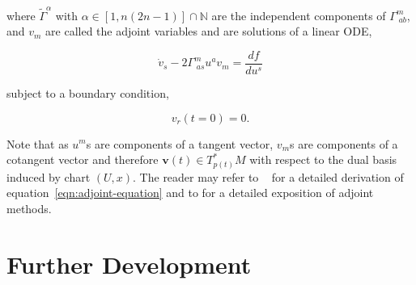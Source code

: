 \documentclass{article}
\begin{document}
where $\tilde{\Gamma}^{\alpha}$ with $\alpha \in [1,n(2n-1)] \cap
\mathbb{N}$ are the independent components of $\Gamma^{m}_{\;ab}$, and
$v_{m}$ are called the adjoint variables and are solutions of a linear
ODE,

\begin{equation}\label{eqn:adjoint-equation}
\dot{v}_{s} - 2 \Gamma^{m}_{\;as} u^{a} v_{m} = \frac{df}{du^{s}}
\end{equation}

subject to a boundary condition,

\begin{equation}\label{eqn:adjoint-bc}
v_{r}( t = 0 ) = 0.
\end{equation}

Note that as $u^{m}$s are components of a tangent vector, $v_{m}$s are
components of a cotangent vector and therefore $\boldsymbol{v}(t) \in
T^{*}_{p(t)}M$ with respect to the dual basis induced by chart $(U,
x)$. The reader may refer to ~\cite{emami-geo-2021} for a detailed
derivation of equation~\ref{eqn:adjoint-equation} and to
\cite{adjoint-giles} for a detailed exposition of adjoint methods.

\section{Further Development}\label{section:future-work}



\end{document}
